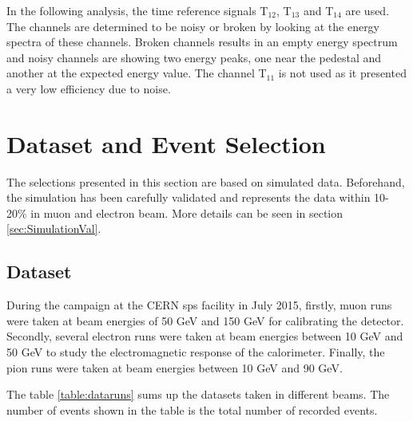 In the following analysis, the time reference signals T$_{12}$, T$_{13}$ and T$_{14}$ are used. The channels are determined to be noisy or broken by looking at the energy spectra of these channels. Broken channels results in an empty energy spectrum and noisy channels are showing two energy peaks, one near the pedestal and another at the expected energy value. The channel T$_{11}$ is not used as it presented a very low efficiency due to noise.

\section{Dataset and Event Selection}

The selections presented in this section are based on simulated data. Beforehand, the simulation has been carefully validated and represents the data within 10-20\% in muon and electron beam. More details can be seen in section \ref{sec:SimulationVal}.

\subsection{Dataset}
\label{subsec:dataset}

During the campaign at the CERN \acrshort{sps} facility in July 2015, firstly, muon runs were taken at beam energies of 50 GeV and 150 GeV for calibrating the detector. Secondly, several electron runs were taken at beam energies between 10 GeV and 50 GeV to study the electromagnetic response of the calorimeter. Finally, the pion runs were taken at beam energies between 10 GeV and 90 GeV.

The table \ref{table:dataruns} sums up the datasets taken in different beams. The number of events shown in the table is the total number of recorded events.

